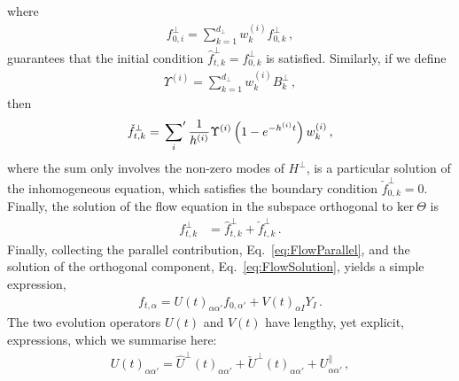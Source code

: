where
\begin{align}
    \label{eq:InitialCi}
    f^{\perp}_{0,i} = \sum_{k=1}^{d_\perp} w^{(i)}_k f^\perp_{0,k}\, ,
\end{align}
guarantees that the initial condition $\hat{f}^\perp_{t,k}=f^\perp_{0,k}$ is
satisfied. Similarly, if we define
\begin{align}
    \label{eq:BiDef}
    \Upsilon^{(i)} = \sum_{k=1}^{d_\perp} w^{(i)}_k B^\perp_{k}\, ,
\end{align}
then
\begin{align}
    \label{eq:PartSol}
    \check{f}^\perp_{t,k} = \sideset{}{'}\sum_{i} \frac{1}{h^{(i)}} \Upsilon^{(i)}
        \left(1 - e^{-h^{(i)}t}\right) w^{(i)}_k\, ,
\end{align}
where the sum only involves the non-zero modes of $H^\perp$, is a particular
solution of the inhomogeneous equation, which satisfies the boundary condition
$\check{f}^{\perp}_{0,k}=0$. Finally, the solution of the flow equation in the
subspace orthogonal to $\text{ker}\ \Theta$ is
\begin{align}
    f^\perp_{t,k}
    \label{eq:FlowSolution}
        &= \hat{f}^\perp_{t,k} + \check{f}^\perp_{t,k}
        \, .
\end{align}
Finally, collecting the parallel contribution, Eq.~\eqref{eq:FlowParallel}, and
the solution of the orthogonal component, Eq.~\eqref{eq:FlowSolution}, yields a
simple expression,
\begin{align}
    \label{eq:AnalyticSol}
    f_{t,\alpha}
        = U(t)_{\alpha\alpha'} f_{0,\alpha'} + V(t)_{\alpha I} Y_{I}\, .
\end{align}
The two evolution operators $U(t)$ and $V(t)$ have lengthy, yet explicit,
expressions, which we summarise here: 
\begin{align}
    U(t)_{\alpha\alpha'} = \hat{U}^\perp(t)_{\alpha\alpha'}
        + \check{U}^\perp(t)_{\alpha\alpha'} + U^\parallel_{\alpha\alpha'}\, ,
\end{align}
